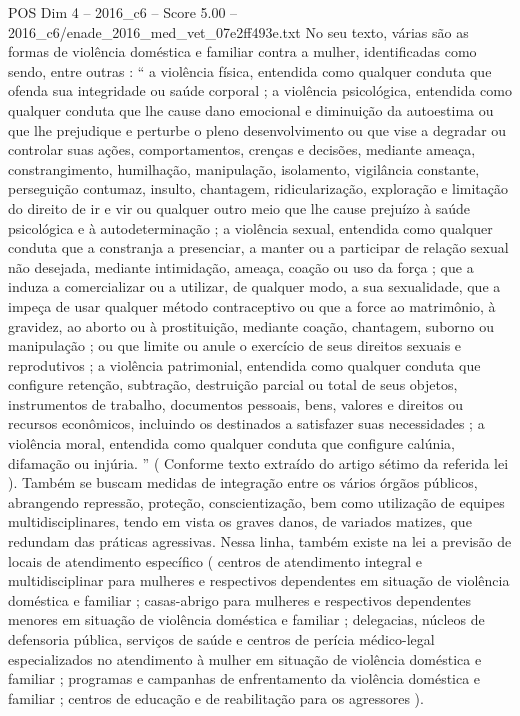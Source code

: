 \begin{textsample}{POS Dim 4 – 2016\_c6 – Score 5.00 – 2016\_c6/enade\_2016\_med\_vet\_07e2ff493e.txt}
No seu texto, várias são as formas de violência doméstica e familiar contra a mulher, identificadas como sendo, entre outras : “ a violência física, entendida como qualquer conduta que ofenda sua integridade ou saúde corporal ; a violência psicológica, entendida como qualquer conduta que lhe cause dano emocional e diminuição da autoestima ou que lhe prejudique e perturbe o pleno desenvolvimento ou que vise a degradar ou controlar suas ações, comportamentos, crenças e decisões, mediante ameaça, constrangimento, humilhação, manipulação, isolamento, vigilância constante, perseguição contumaz, insulto, chantagem, ridicularização, exploração e limitação do direito de ir e vir ou qualquer outro meio que lhe cause prejuízo à saúde psicológica e à autodeterminação ; a violência sexual, entendida como qualquer conduta que a constranja a presenciar, a manter ou a participar de relação sexual não desejada, mediante intimidação, ameaça, coação ou uso da força ; que a induza a comercializar ou a utilizar, de qualquer modo, a sua sexualidade, que a impeça de usar qualquer método contraceptivo ou que a force ao matrimônio, à gravidez, ao aborto ou à prostituição, mediante coação, chantagem, suborno ou manipulação ; ou que limite ou anule o exercício de seus direitos sexuais e reprodutivos ; a violência patrimonial, entendida como qualquer conduta que configure retenção, subtração, destruição parcial ou total de seus objetos, instrumentos de trabalho, documentos pessoais, bens, valores e direitos ou recursos econômicos, incluindo os destinados a satisfazer suas necessidades ; a violência moral, entendida como qualquer conduta que configure calúnia, difamação ou injúria. ” ( Conforme texto extraído do artigo sétimo da referida lei ).
Também se buscam medidas de integração entre os vários órgãos públicos, abrangendo repressão, proteção, conscientização, bem como utilização de equipes multidisciplinares, tendo em vista os graves danos, de variados matizes, que redundam das práticas agressivas.
Nessa linha, também existe na lei a previsão de locais de atendimento específico ( centros de atendimento integral e multidisciplinar para mulheres e respectivos dependentes em situação de violência doméstica e familiar ; casas-abrigo para mulheres e respectivos dependentes menores em situação de violência doméstica e familiar ; delegacias, núcleos de defensoria pública, serviços de saúde e centros de perícia médico-legal especializados no atendimento à mulher em situação de violência doméstica e familiar ; programas e campanhas de enfrentamento da violência doméstica e familiar ; centros de educação e de reabilitação para os agressores ).

\end{textsample}
